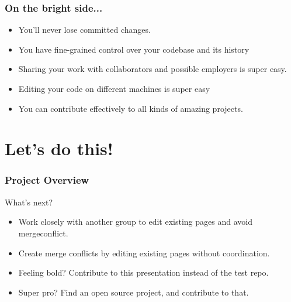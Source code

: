 \documentclass[unknownkeysallowed]{beamer}
\begin{document}
\begin{frame}
    \frametitle{On the bright side...}
    \begin{itemize}
        \item{You'll never lose committed changes.}
        \item{You have fine-grained control over your codebase and its history}
        \item{Sharing your work with collaborators and possible employers is super easy.}
        \item{Editing your code on different machines is super easy}
        \item{You can contribute effectively to all kinds of amazing projects.}
    \end{itemize}
\end{frame}

\section{Let's do this!}
\begin{frame}
    \frametitle{Project Overview}
    What's next?
    \begin{itemize}
        \item{Work closely with another group to edit existing pages and avoid mergeconflict.}
        \item{Create merge conflicts by editing existing pages without coordination.}
        \item{Feeling bold? Contribute to this presentation instead of the test repo.}
        \item{Super pro? Find an open source project, and contribute to that.}
    \end{itemize}
\end{frame}
\end{document}
